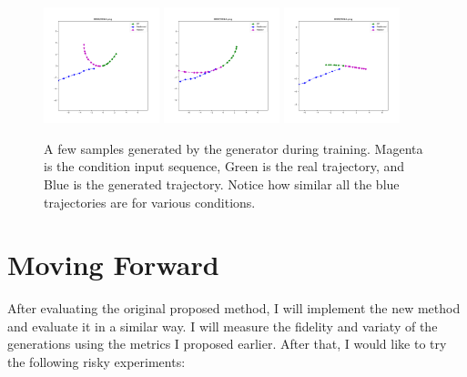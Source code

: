 \documentclass{article}
\begin{document}
\begin{figure}
    \centering
    \includegraphics[width=0.3\textwidth]{mode_collapse0}
    \includegraphics[width=0.3\textwidth]{mode_collapse1}
    \includegraphics[width=0.3\textwidth]{mode_collapse2}\\
    \caption{A few samples generated by the generator during training. Magenta is the condition input sequence, Green is the real trajectory, and Blue is the generated trajectory. Notice how similar all the blue trajectories are for various conditions.}
    \label{sequential_training_loss}
\end{figure}

\section{Moving Forward}
After evaluating the original proposed method, I will implement the new method and evaluate it in a similar way. I will measure the fidelity and variaty of the generations using the metrics I proposed earlier. After that, I would like to try the following risky experiments:
\end{document}
